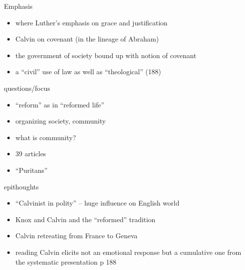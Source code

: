 \begin{frame}[label=sec-2-3]{Emphasis}
\begin{itemize}[<+->]
\item where Luther's emphasis on grace and justification
\item Calvin on covenant (in the lineage of Abraham)
\item the government of society bound up with notion of covenant
\item a ``civil'' use of law as well as ``theological'' (188)
\end{itemize}
\end{frame}

\begin{frame}[label=sec-2-4]{questions/focus}
\begin{itemize}[<+->]
\item ``reform'' as in ``reformed life''
\item organizing society, community
\item what is community?
\item 39 articles
\item ``Puritans''
\end{itemize}
\end{frame}

\begin{frame}[label=sec-2-5]{epithoughts}
\begin{itemize}[<+->]
\item ``Calvinist in polity'' -- huge influence on English world
\item Knox and Calvin and the ``reformed'' tradition
\item Calvin retreating from France to Geneva
\item reading Calvin elicits not an emotional response but a cumulative one from the systematic presentation p 188
\end{itemize}
\end{frame}

